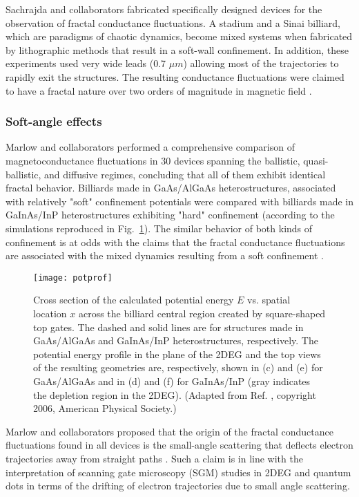 \documentclass[a4paper,10pt]{article}
\newcommand{\nin}{\noindent}
\begin{document}
Sachrajda and collaborators \cite{Taylor97,Sachrajda98} fabricated specifically designed devices for the observation of fractal conductance fluctuations. A stadium and a Sinai billiard, which are paradigms of  chaotic dynamics, become mixed systems when fabricated by lithographic methods that result in a soft-wall confinement. In addition, these experiments used very wide leads (0.7 $\mu m$) allowing most of the trajectories to rapidly exit the structures. The resulting conductance fluctuations were claimed to have a fractal nature over two
orders of magnitude in magnetic field \cite{Sachrajda98,Micolich98}. 

\subsubsection{Soft-angle effects}
\label{subsubsec:sae}

\nin Marlow and collaborators \cite{Marlow06} performed a comprehensive comparison of magnetoconductance fluctuations in 30 devices spanning the ballistic, quasi-ballistic, and diffusive regimes, concluding that all of them exhibit identical fractal behavior. Billiards made in GaAs/AlGaAs heterostructures, associated with relatively "soft" confinement potentials were compared with billiards made in GaInAs/InP heterostructures exhibiting "hard" confinement (according to the simulations reproduced in Fig.~\ref{fig:potprof}). The similar behavior of both kinds of confinement is at odds with the claims that the fractal conductance fluctuations are associated with the mixed dynamics resulting from a soft confinement \cite{Sachrajda98}.

\begin{figure}
\setlength{\unitlength}{1mm}
\centerline{\texttt{[image: potprof]}}
\caption{
Cross section of the calculated potential energy $E$ vs. spatial location $x$ across the billiard central region created by square-shaped top gates. The dashed and solid lines are for structures made in GaAs/AlGaAs and GaInAs/InP heterostructures, respectively. The potential energy profile in the plane of the 2DEG and the top views of the resulting geometries are, respectively,  shown in (c) and (e) for GaAs/AlGaAs and in (d) and (f) for GaInAs/InP (gray indicates the depletion region in the 2DEG). 
(Adapted from Ref. \protect\cite{Marlow06}, copyright 2006, American Physical Society.)}
\label{fig:potprof}
\end{figure}

\nin Marlow and collaborators proposed that the origin of the fractal conductance fluctuations found in all devices is the small-angle scattering that deflects electron trajectories away from straight paths \cite{Marlow06}. Such a claim is in line with the interpretation of scanning gate microscopy (SGM) studies in 2DEG \cite{topinka01a} and quantum dots \cite{crook03} in terms of the drifting of electron trajectories due to small angle scattering. 
\end{document}

